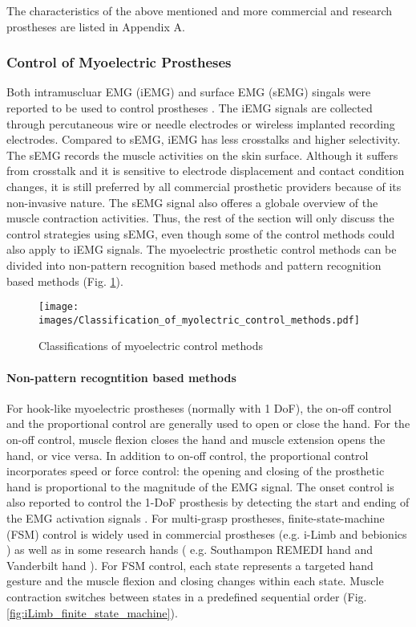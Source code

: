 The characteristics of the above mentioned and more commercial and research prostheses are listed in Appendix A. 

\subsubsection{Control of Myoelectric Prostheses}
Both intramuscluar EMG (iEMG) and surface EMG (sEMG) singals were reported to be used to control prostheses \cite{smith2014real,kamavuako2009relationship,rafiee2011feature}. The iEMG signals are collected through percutaneous wire or needle electrodes or wireless implanted recording electrodes. Compared to sEMG, iEMG has less crosstalks and higher selectivity\cite{micera2010control}. The sEMG records the muscle activities on the skin surface. Although it suffers from crosstalk and it is sensitive to electrode displacement and contact condition changes, it is still preferred by all commercial prosthetic providers because of its non-invasive nature. The sEMG signal also offeres a globale overview of the muscle contraction activities. Thus, the rest of the section will only discuss the control strategies using sEMG, even though some of the control methods could also apply to iEMG signals.
The myoelectric prosthetic control methods can be divided into non-pattern recognition based methods and pattern recognition based methods (Fig. \ref{fig:myoelectric_control_classification_methods}). 

 \begin{figure}[ht!]
    \centering
        \texttt{[image: images/Classification\_of\_myolectric\_control\_methods.pdf]}
        \caption{Classifications of myoelectric control methods}
        \label{fig:myoelectric_control_classification_methods}
\end{figure}

\paragraph{Non-pattern recogntition based methods}
For hook-like myoelectric prostheses (normally with 1 DoF), the on-off control and the proportional control are generally used to open or close the hand. For the on-off control, muscle flexion closes the hand and muscle extension opens the hand, or vice versa.
In addition to on-off control, the proportional control incorporates speed or force control: the opening and closing of the prosthetic hand is proportional to the magnitude of the EMG signal.
The onset control is also reported to control the 1-DoF prosthesis by detecting the start and ending of the EMG activation signals \cite{staude2001onset}. 
For multi-grasp prostheses, finite-state-machine (FSM) control is widely used in commercial prostheses (e.g. i-Limb \cite{touchbionics_i_limb} and bebionics \cite{bebionic}) as well as in some research hands ( e.g. Southampon REMEDI hand \cite{cotton2006control} and Vanderbilt hand \cite{dalley2010multigrasp}). For FSM control, each state represents a targeted hand gesture and the muscle flexion and closing changes within each state. Muscle contraction switches between states in a predefined sequential order (Fig. \ref{fig:iLimb_finite_state_machine}).
  
